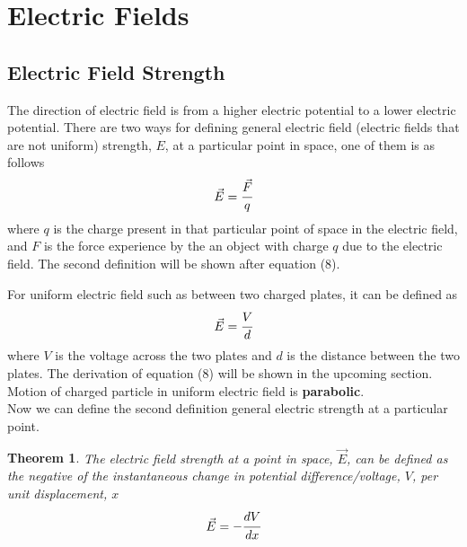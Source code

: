 \documentclass{article}
\newtheorem{theorem}{Theorem}[subsection]
\begin{document}
\newpage
\section{Electric Fields}

 \subsection{Electric Field Strength}

The direction of electric field is from a higher electric potential to a lower electric potential. There are two ways for defining general electric field (electric fields that are not uniform) strength, $E$, at a particular point in space, one of them is as follows
\begin{equation}
    \vec{E}=\cfrac{\vec{F}}{q}
\end{equation}
where $q$ is the charge present in that particular point of space in the electric field, and $F$ is the force experience by the an object with charge $q$ due to the electric field. The second definition will be shown after equation (8).

For uniform electric field such as between two charged plates, it can be defined as
\begin{equation}
  \vec{E}=\cfrac{V}{d}
\end{equation}
where $V$ is the voltage across the two plates and $d$ is the distance between the two plates. The derivation of equation (8) will be shown in the upcoming section. Motion of charged particle in uniform electric field is \textbf{parabolic}.
\newline\\
Now we can define the second definition general electric strength at a particular point.

\begin{theorem}
The electric field strength at a point in space, $\vec{E}$, can be defined as the negative of the instantaneous change in potential difference/voltage, $V$, per unit displacement, $x$
$$\vec{E}=-\cfrac{dV}{dx}$$
\end{theorem}
\end{document}
